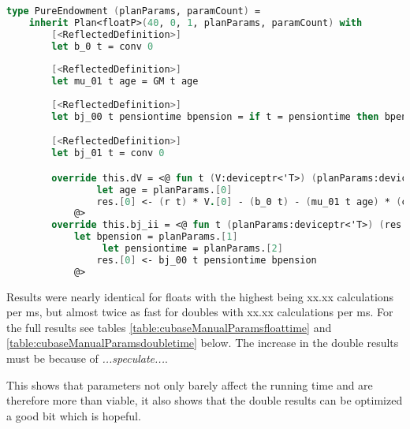 \begin{lstlisting}[language=FSharp, caption=Parameterized pure endowment life insurance plan in F\# Alea.cuBase, label=cubase_pureendowmentparams]
type PureEndowment (planParams, paramCount) =
    inherit Plan<floatP>(40, 0, 1, planParams, paramCount) with
        [<ReflectedDefinition>]
        let b_0 t = conv 0
    
        [<ReflectedDefinition>]
        let mu_01 t age = GM t age
    
        [<ReflectedDefinition>]
        let bj_00 t pensiontime bpension = if t = pensiontime then bpension else conv 0

        [<ReflectedDefinition>]
        let bj_01 t = conv 0

        override this.dV = <@ fun t (V:deviceptr<'T>) (planParams:deviceptr<'T>) (res:deviceptr<'T>) -> 
                let age = planParams.[0]
                res.[0] <- (r t) * V.[0] - (b_0 t) - (mu_01 t age) * (conv 0 - V.[0] + (bj_01 t))
            @>
        override this.bj_ii = <@ fun t (planParams:deviceptr<'T>) (res:deviceptr<'T>) -> 
		    let bpension = planParams.[1]                
                 let pensiontime = planParams.[2]
                res.[0] <- bj_00 t pensiontime bpension
            @>
\end{lstlisting}

Results were nearly identical for floats with the highest being xx.xx calculations per ms, but almost twice as fast for doubles with xx.xx calculations per ms. 
For the full results see tables \ref{table:cubaseManualParamsfloattime} and \ref{table:cubaseManualParamsdoubletime} below.
The increase in the double results must be because of \emph{...speculate...}.

This shows that parameters not only barely affect the running time and are therefore more than viable, it also shows that the double results can be optimized a good bit which is hopeful.

\begin{table}[h!]
\centering
{}
\caption{F\# Alea.cuBase calculations per ms with float precision and parameters\label{table:cubaseManualParamsfloattime}}
\end{table}

